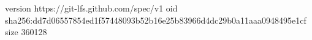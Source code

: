 version https://git-lfs.github.com/spec/v1
oid sha256:dd7d06557854ed1f57448093b52b16e25b83966d4dc29b0a11aaa0948495e1cf
size 360128
